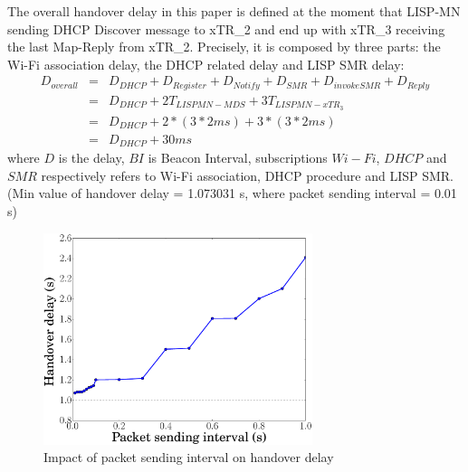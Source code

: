 The overall handover delay in this paper is defined at the moment that LISP-MN sending DHCP Discover message to xTR\_2 and end up with xTR\_3 receiving the last Map-Reply from xTR\_2. Precisely, it is composed by three parts: the Wi-Fi association delay, the DHCP related delay and LISP SMR delay:
\begin{eqnarray}
	D_{overall} &=& D_{DHCP} + D_{Register} + D_{Notify} + D_{SMR} + D_{invokeSMR} + D_{Reply} \nonumber \\
	&=& D_{DHCP} + 2T_{LISPMN-MDS} + 3T_{LISPMN-xTR_3} \nonumber \\
	&=& D_{DHCP} + 2* (3*2ms) + 3*(3*2ms)\nonumber \\
	&=& D_{DHCP} + 30 ms
\end{eqnarray}
where $D$ is the delay, $BI$ is Beacon Interval, subscriptions $Wi-Fi$, $DHCP$ and $SMR$ respectively refers to Wi-Fi association, DHCP procedure and LISP SMR. (Min value of handover delay = 1.073031 s, where packet sending interval = 0.01 s) 



\begin{figure}[!th]
	\centering
	\includegraphics[width=0.7\textwidth]{Pics/LISP_mobility_LISPMN_PacketInterval}
	\caption{Impact of packet sending interval on handover delay}
	\label{LISP_mobility_LISPMN_PacketInterval}
\end{figure}


